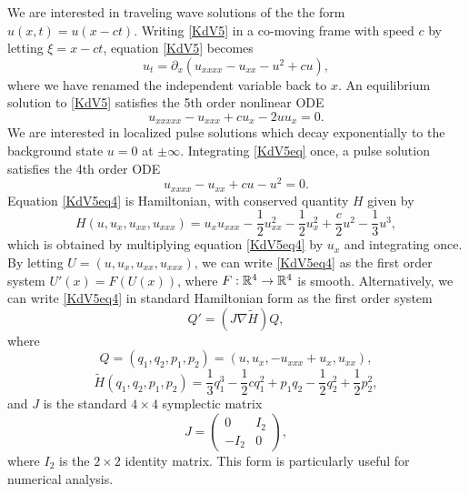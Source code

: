 \documentclass[11pt,reqno]{amsart}
\theoremstyle{plain}
\theoremstyle{definition}
\theoremstyle{remark}
\begin{document}
We are interested in traveling wave solutions of the the form $u(x, t) = u(x - ct)$. Writing \cref{KdV5} in a co-moving frame with speed $c$ by letting $\xi = x - ct$, equation \cref{KdV5} becomes
\begin{equation}\label{KdV5c}
u_t = \partial_x(u_{xxxx} - u_{xx} - u^2 + cu) ,
\end{equation}
where we have renamed the independent variable back to $x$. An equilibrium solution to \cref{KdV5} satisfies the 5th order nonlinear ODE
\begin{equation}\label{KdV5eq}
u_{xxxxx} - u_{xxx} + c u_x - 2 u u_x = 0.
\end{equation}
We are interested in localized pulse solutions which decay exponentially to the background state $u = 0$ at $\pm \infty$. Integrating \cref{KdV5eq} once, a pulse solution satisfies the 4th order ODE
\begin{equation}\label{KdV5eq4}
u_{xxxx} - u_{xx} + c u - u^2 = 0.
\end{equation}
Equation \cref{KdV5eq4} is Hamiltonian, with conserved quantity $H$ given by
\begin{equation}\label{KdV5ham}
H(u, u_x, u_{xx}, u_{xxx}) = u_x u_{xxx} - \frac{1}{2}u_{xx}^2 - \frac{1}{2}u_x^2 + \frac{c}{2}u^2 - \frac{1}{3}u^3,
\end{equation}
which is obtained by multiplying equation \cref{KdV5eq4} by $u_x$ and integrating once. By letting $U = (u, u_x, u_{xx}, u_{xxx})$, we can write \cref{KdV5eq4} as the first order system $U'(x) = F(U(x))$, where $F: \mathbb{R}^4 \rightarrow \mathbb{R}^4$ is smooth. Alternatively, we can write \cref{KdV5eq4} in standard Hamiltonian form as the first order system
\begin{equation}\label{KdV5ham2}
Q' = (J \nabla \tilde{H}) Q,
\end{equation}
where 
\begin{equation}\label{KdV5Q}
Q = (q_1, q_2, p_1, p_2) = (u, u_x, -u_{xxx} + u_x, u_{xx}),
\end{equation}
\begin{equation}
\tilde{H}(q_1, q_2, p_1, p_2) = \frac{1}{3}q_1^3 - \frac{1}{2}c q_1^2 + p_1 q_2 - \frac{1}{2}q_2^2 + \frac{1}{2}p_2^2,
\end{equation}
and $J$ is the standard $4 \times 4$ symplectic matrix
\[
J = \begin{pmatrix}
0 & I_2 \\ -I_2 & 0
\end{pmatrix},
\]
where $I_2$ is the $2\times 2$ identity matrix. This form is particularly useful for numerical analysis.
\end{document}
